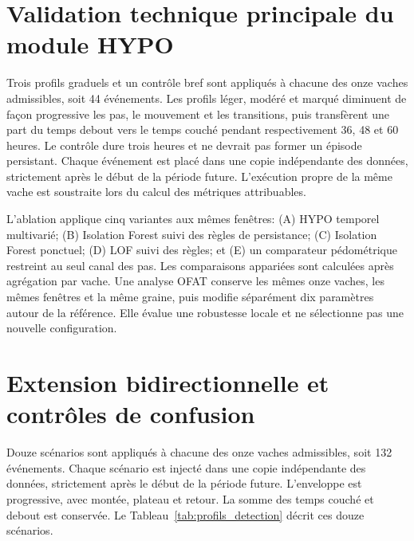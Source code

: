 \section{Validation technique principale du module HYPO}

Trois profils graduels et un contrôle bref sont appliqués à chacune des onze vaches
admissibles, soit 44 événements. Les profils léger, modéré et marqué diminuent de façon
progressive les pas, le mouvement et les transitions, puis transfèrent une part du temps
debout vers le temps couché pendant respectivement 36, 48 et 60 heures. Le contrôle dure
trois heures et ne devrait pas former
un épisode persistant. Chaque événement est placé dans une copie indépendante des données,
strictement après le début de la période future. L'exécution propre de la même vache est
soustraite lors du calcul des métriques attribuables.

L'ablation applique cinq variantes aux mêmes fenêtres: (A) HYPO temporel multivarié;
(B) Isolation Forest suivi des règles de persistance; (C) Isolation Forest ponctuel;
(D) LOF suivi des règles; et (E) un comparateur pédométrique restreint au seul canal des pas. Les comparaisons appariées sont calculées après agrégation par
vache. Une analyse OFAT conserve les mêmes onze vaches, les mêmes fenêtres et la même graine,
puis modifie séparément dix paramètres autour de la référence. Elle évalue une robustesse
locale et ne sélectionne pas une nouvelle configuration.

\section{Extension bidirectionnelle et contrôles de confusion}

Douze scénarios sont appliqués à chacune des onze vaches admissibles, soit 132 événements.
Chaque scénario est injecté dans une copie indépendante des données, strictement après le
début de la période future. L'enveloppe est progressive, avec montée, plateau et retour. La
somme des temps couché et debout est conservée. Le Tableau~\ref{tab:profils_detection} décrit ces
douze scénarios.

